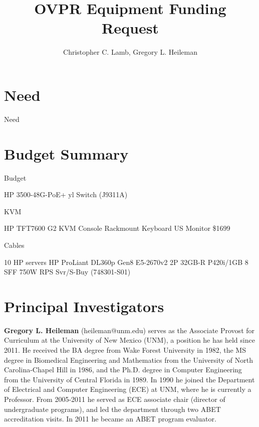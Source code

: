 \documentclass[12pt,letterpaper]{article}
\author{Christopher C. Lamb, Gregory L. Heileman}
\title{OVPR Equipment Funding Request}
\date{}
\begin{document}
\maketitle


\section{Need}
Need

\newpage
\section{Budget Summary}
Budget

HP 3500-48G-PoE+ yl Switch
(J9311A) 

KVM

HP TFT7600 G2 KVM Console Rackmount Keyboard US Monitor \$1699

Cables

10 HP servers HP ProLiant DL360p Gen8 E5-2670v2 2P 32GB-R P420i/1GB 8 SFF 750W RPS Svr/S-Buy
(748301-S01)



\newpage
\section{Principal Investigators}
{\bf Gregory L. Heileman} (heileman@unm.edu) serves as the Associate Provost for Curriculum at the University of New Mexico (UNM), a position he has held since 2011.  He received the BA degree from Wake Forest University in 1982, the MS degree in Biomedical Engineering and Mathematics from the University of North Carolina-Chapel Hill in 1986, and the Ph.D. degree in Computer Engineering from the University of Central Florida in 1989.  In 1990 he joined the Department of Electrical and Computer Engineering (ECE) at UNM, where he is currently a Professor. From 2005-2011 he served as ECE associate chair (director of undergraduate programs), and led the department through two ABET accreditation visits.  In 2011 he became an ABET program evaluator. 
\end{document}
